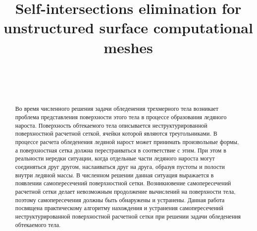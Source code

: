 \documentclass[
11pt,%
tightenlines,%
twoside,%
onecolumn,%
nofloats,%
nobibnotes,%
nofootinbib,%
superscriptaddress,%
noshowpacs,%
centertags]%
{revtex4}
\begin{document}

\title{Self-intersections elimination for unstructured surface computational meshes}

\author{~}

\author{~}



\begin{abstract}
Во время численного решения задачи обледенения трехмерного тела возникает проблема представления поверхности этого тела в процессе образования ледяного нароста.
Поверхность обтекаемого тела описывается неструктурированной поверхностной расчетной сеткой, ячейки которой являются треугольниками.
В процессе расчета обледенения ледяной нарост может принимать произвольные формы, а поверхностная сетка должна перестраиваться в соответствие с этим.
При этом в реальности нередки ситуации, когда отдельные части ледяного нароста могут соединяться друг другом, наслаиваться друг на друга, образуя пустоты и полости внутри ледяной массы.
В численном решении данная ситуация выражается в появлении самопересечений поверхностной сетки.
Возникновение самопересечений расчетной сетки делает невозможным продолжение вычислений на поверхности тела, поэтому самопересечения должны быть обнаружены и устранены.
Данная работа посвящена практическому алгоритму нахождения и устранения самопересечений неструктурированной поверхностной расчетной сетки при решении задачи обледенения обтекаемого тела.
\end{abstract}


\end{document}
